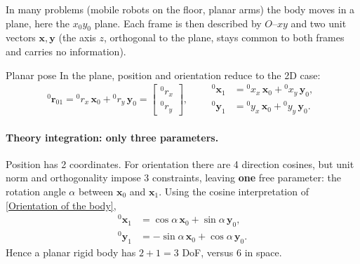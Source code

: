 In many problems (mobile robots on the floor, planar arms) the body moves in a plane, here the $x_0y_0$ plane. Each frame is then described by $O$--$xy$ and two unit vectors $\mathbf{x},\mathbf{y}$ (the axis $z$, orthogonal to the plane, stays common to both frames and carries no information).

\begin{defbox}{Planar pose}
In the plane, position and orientation reduce to the 2D case:
\[
{}^0\mathbf{r}_{01}={}^0r_x\,\mathbf{x}_0+{}^0r_y\,\mathbf{y}_0=\begin{bmatrix}{}^0r_x\\ {}^0r_y\end{bmatrix},
\qquad
\begin{aligned}
{}^0\mathbf{x}_1&={}^0x_x\,\mathbf{x}_0+{}^0x_y\,\mathbf{y}_0,\\
{}^0\mathbf{y}_1&={}^0y_x\,\mathbf{x}_0+{}^0y_y\,\mathbf{y}_0.
\end{aligned}
\]
\end{defbox}

\paragraph{Theory integration: only three parameters.} Position has 2 coordinates. For orientation there are 4 direction cosines, but unit norm and orthogonality impose 3 constraints, leaving \textbf{one} free parameter: the rotation angle $\alpha$ between $\mathbf{x}_0$ and $\mathbf{x}_1$. Using the cosine interpretation of \ref{Orientation of the body},
\begin{align*}
{}^0\mathbf{x}_1 &= \cos\alpha\,\mathbf{x}_0+\sin\alpha\,\mathbf{y}_0,\\
{}^0\mathbf{y}_1 &= -\sin\alpha\,\mathbf{x}_0+\cos\alpha\,\mathbf{y}_0.
\end{align*}
Hence a planar rigid body has $2+1=3$ DoF, versus $6$ in space.

\begin{center}
\end{center}

